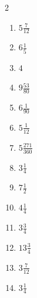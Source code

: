 \documentclass[12pt]{article}
\begin{document}
\begin{multicols}{2}
\begin{enumerate}
\item $ 5 \frac{7}{12} $
\item $ 6 \frac{1}{5} $
\item $ 4 $
\item $ 9 \frac{53}{80} $
\item $ 6 \frac{1}{90} $
\item $ 5 \frac{1}{12} $
\item $ 5 \frac{271}{360} $
\item $ 3 \frac{1}{4} $
\item $ 7 \frac{1}{2} $
\item $ 4 \frac{1}{4} $
\item $ 3 \frac{3}{4} $
\item $ 13 \frac{3}{4} $
\item $ 3 \frac{7}{12} $
\item $ 3 \frac{1}{4} $
\end{enumerate}\end{multicols}\newpage
\end{document}
